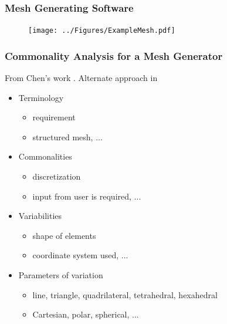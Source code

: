 \documentclass[t,12pt,numbers,fleqn]{beamer}
\begin{document}

\begin{frame}
\frametitle{Mesh Generating Software}
\begin{figure}
\begin{center}
{
 \texttt{[image: ../Figures/ExampleMesh.pdf]}
}
\end{center}
\end{figure}

\end{frame}


\begin{frame}
\frametitle{Commonality Analysis for a Mesh Generator}

From Chen's work \cite{Chen2003, SmithAndChen2004, SmithAndChen2004b}.
Alternate approach in \cite{BastarricaAndHitschfeld2006, RosselEtAl2014,
  BastarricaAndHitschfeld-Kahler2004,
  Bastarrica2002, BastarricaAndHitschfeld2004}

\begin{itemize}

\item Terminology
\begin{itemize}
\item requirement
\item structured mesh, ...
\end{itemize}

\item Commonalities
\begin{itemize}
\item discretization
\item input from user is required, ...
\end{itemize}

\item Variabilities
\begin{itemize}
\item shape of elements
\item coordinate system used, ...
\end{itemize}

\item Parameters of variation
\begin{itemize}
\item line, triangle, quadrilateral, tetrahedral, hexahedral
\item Cartesian, polar, spherical, ...
\end{itemize}

\end{itemize}

\end{frame}
\end{document}
